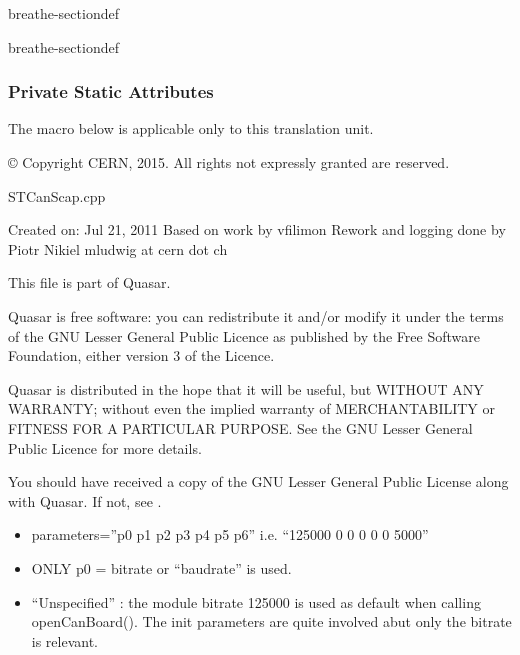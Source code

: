 \documentclass[a4paper,10pt,english]{sphinxmanual}
\begin{document}
\begin{fulllineitems}
\begin{sphinxuseclass}{breathe-sectiondef}
\begin{fulllineitems}
\end{fulllineitems}


\end{sphinxuseclass}
\begin{sphinxuseclass}{breathe-sectiondef}\subsubsection*{Private Static Attributes}


\begin{fulllineitems}
%
\pysigstartmultiline
{}%
\pysigstopmultiline
\sphinxAtStartPar
The macro below is applicable only to this translation unit. 

\sphinxAtStartPar
© Copyright CERN, 2015. All rights not expressly granted are reserved.

\sphinxAtStartPar
STCanScap.cpp

\sphinxAtStartPar
Created on: Jul 21, 2011 Based on work by vfilimon Rework and logging done by Piotr Nikiel  mludwig at cern dot ch

\sphinxAtStartPar
This file is part of Quasar.

\sphinxAtStartPar
Quasar is free software: you can redistribute it and/or modify it under the terms of the GNU Lesser General Public Licence as published by the Free Software Foundation, either version 3 of the Licence.

\sphinxAtStartPar
Quasar is distributed in the hope that it will be useful, but WITHOUT ANY WARRANTY; without even the implied warranty of MERCHANTABILITY or FITNESS FOR A PARTICULAR PURPOSE. See the GNU Lesser General Public Licence for more details.

\sphinxAtStartPar
You should have received a copy of the GNU Lesser General Public License along with Quasar. If not, see . 

\end{fulllineitems}


\end{sphinxuseclass}
\end{fulllineitems}

\begin{itemize}
\item {} 
\sphinxAtStartPar
parameters=”p0 p1 p2 p3 p4 p5 p6” i.e. “125000 0 0 0 0 0 5000”

\item {} 
\sphinxAtStartPar
ONLY p0 = bitrate or “baudrate” is used.

\item {} 
\sphinxAtStartPar
“Unspecified” : the module bitrate 125000 is used as default when calling openCanBoard(). The init parameters are quite involved abut only the bitrate is relevant.

\end{itemize}
\end{document}
